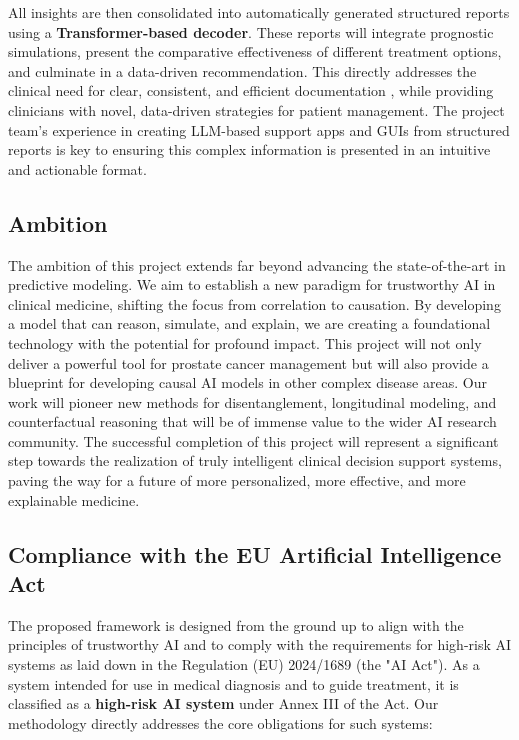\documentclass[11pt, a4paper]{article}
\begin{document}
All insights are then consolidated into automatically generated structured reports using a \textbf{Transformer-based decoder}. These reports will integrate prognostic simulations, present the comparative effectiveness of different treatment options, and culminate in a data-driven recommendation. This directly addresses the clinical need for clear, consistent, and efficient documentation \cite{JorgHalfmann2023, SacoranskyKwan2024}, while providing clinicians with novel, data-driven strategies for patient management. The project team's experience in creating LLM-based support apps and GUIs from structured reports is key to ensuring this complex information is presented in an intuitive and actionable format.

\subsection{Ambition}
The ambition of this project extends far beyond advancing the state-of-the-art in predictive modeling. We aim to establish a new paradigm for trustworthy AI in clinical medicine, shifting the focus from correlation to causation. By developing a model that can reason, simulate, and explain, we are creating a foundational technology with the potential for profound impact. This project will not only deliver a powerful tool for prostate cancer management but will also provide a blueprint for developing causal AI models in other complex disease areas. Our work will pioneer new methods for disentanglement, longitudinal modeling, and counterfactual reasoning that will be of immense value to the wider AI research community. The successful completion of this project will represent a significant step towards the realization of truly intelligent clinical decision support systems, paving the way for a future of more personalized, more effective, and more explainable medicine.

\subsection{Compliance with the EU Artificial Intelligence Act}
The proposed framework is designed from the ground up to align with the principles of trustworthy AI and to comply with the requirements for high-risk AI systems as laid down in the Regulation (EU) 2024/1689 (the "AI Act"). As a system intended for use in medical diagnosis and to guide treatment, it is classified as a \textbf{high-risk AI system} under Annex III of the Act. Our methodology directly addresses the core obligations for such systems:
\end{document}
